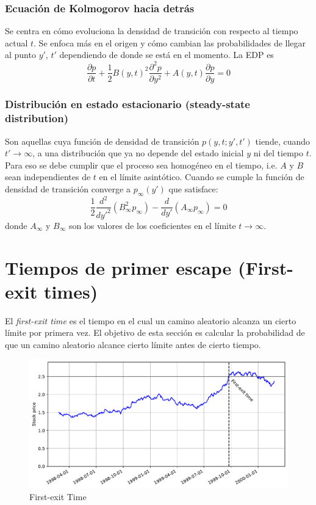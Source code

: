 \subsubsection{Ecuación de Kolmogorov hacia detrás}\label{sec:KolmogorovDetras}
Se centra en cómo evoluciona la densidad de transición con respecto al tiempo actual $t$. Se enfoca más en el origen  y cómo cambian las probabilidades de llegar al punto $y'$, $t'$ dependiendo de donde se está en el momento. La EDP es
\[
    \boxed{\frac{\partial p}{\partial t} + \frac{1}{2} B(y, t)^2 \frac{\partial^2 p}{\partial y^2} + A(y, t) \frac{\partial p}{\partial y} = 0}
\]


\subsubsection{Distribución en estado estacionario (steady-state distribution)}
Son aquellas cuya función de densidad de transición $p(y, t; y', t')$ tiende, cuando $t' \to \infty$, a una distribución que ya no depende del estado inicial $y$ ni del tiempo $t$. Para eso se debe cumplir que el proceso sea homogéneo en el tiempo, i.e. $A$ y $B$ sean independientes de $t$ en el límite asintótico. Cuando se cumple la función de densidad de transición converge a $p_\infty(y')$ que satisface:
\[
    \boxed{\frac{1}{2} \frac{d^2}{dy'^2} \left( B_\infty^2 p_\infty \right) - \frac{d}{dy'} \left( A_\infty p_\infty \right) = 0}
\]
donde $A_\infty$ y $B_\infty$ son los valores de los coeficientes en el límite $t \to \infty$.








\section{Tiempos de primer escape (First-exit times)}\label{sec:FirstExitTimes}
El \textit{first-exit time} es el tiempo en el cual un camino aleatorio alcanza un cierto límite por primera vez. El objetivo de esta sección es calcular la probabilidad de que un camino aleatorio alcance cierto límite antes de cierto tiempo.
\begin{figure}[H]
    \centering
    \includegraphics[width=0.65\linewidth]{Imagenes/Parte1/3_Aleatoriedad/First-exit_Time.pdf}
    \caption{First-exit Time}
\end{figure}




